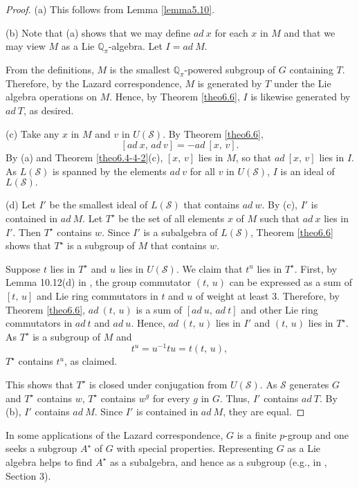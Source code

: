 \documentclass[mathscr]{amsart}
\theoremstyle{theorem}
\theoremstyle{definition}
\numberwithin{equation}{section}
\def\Q{\mathbb{Q}}
\def\S{\mathcal{S}}
\begin{document}
\begin{proof}
(a) This follows from Lemma \ref{lemma5.10}.

(b) Note that (a) shows that we may define $ad\ x$ for each $x$ in
$M$ and that we may view $M$ as a Lie $\Q_\pi$-algebra. Let $I=ad\
M.$

From the definitions, $M$ is the smallest $\Q_\pi$-powered subgroup
of $G$ containing $T.$ Therefore, by the Lazard correspondence, $M$
is generated by $T$ under the Lie algebra operations on $M$. Hence,
by Theorem \ref{theo6.6}, $I$ is likewise generated by $ad\ T$, as
desired.

(c) Take any $x$ in $M$ and $v$ in $U(\S)$. By Theorem
\ref{theo6.6},
$$[ad\ x,\,ad\ v]=-ad\ [x,\,v].$$
By (a) and Theorem \ref{theo6.4-4-2}(c), $[x,\,v]$ lies in $M$, so
that $ad\ [x,\,v]$ lies in $I$. As $L(\S)$ is spanned by the
elements $ad\ v$ for all $v$ in $U(\S)$, $I$ is an ideal of $L(\S).$

(d) Let $I'$ be the smallest ideal of $L(\S)$ that contains $ad\ w$.
By (c), $I'$ is contained in $ad\ M$. Let $T^\star$ be the set of
all elements $x$ of $M$ such that $ad\ x$ lies in $I'.$ Then
$T^\star$ contains $w$. Since $I'$ is a subalgebra of $L(\S)$,
Theorem \ref{theo6.6} shows that $T^\star$ is a subgroup of $M$ that
contains $w$.

Suppose $t$ lies in $T^\star$ and $u$ lies in $U(\S)$. We claim that
$t^u$ lies in $T^\star$. First, by Lemma 10.12(d) in \cite{Kh}, the
group commutator $(t,\,u)$ can be expressed as a sum of $[t,\,u]$
and Lie ring commutators in $t$ and $u$ of weight at least 3.
Therefore, by Theorem \ref{theo6.6}, $ad\ (t,\,u)$ is a sum of $[ad\
u,\,ad\ t]$ and other Lie ring commutators in $ad\ t$ and $ad\ u$.
Hence, $ad\ (t,\,u)$ lies in $I'$ and $(t,\,u)$ lies in $T^\star.$
As $T^\star$ is a subgroup of $M$ and
$$t^u=u^{-1}tu=t(t,\,u),$$
$T^\star$ contains $t^u$, as claimed.

This shows that $T^\star$ is closed under conjugation from $U(\S).$
As $\S$ generates $G$ and $T^\star$ contains $w$, $T^\star$ contains
$w^g$ for every $g$ in $G$. Thus, $I'$ contains $ad\ T$. By (b),
$I'$ contains $ad\ M$. Since $I'$ is contained in $ad\ M$, they are
equal.
\end{proof}

In some applications of the Lazard correspondence, $G$ is a finite
$p$-group and one seeks a subgroup $A^\star$ of $G$ with special
properties. Representing $G$ as a Lie algebra helps to find
$A^\star$ as a subalgebra, and hence  as a subgroup (e.g., in
\cite{GG-FLA}, Section 3).
\end{document}
